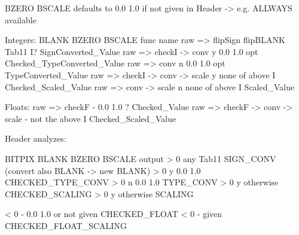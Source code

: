 

BZERO BSCALE defaults to 0.0 1.0 if not given in Header -> e.g. ALLWAYS available
				
Integers:			BLANK	BZERO BSCALE		func name
raw => flipSign		     flipBLANK	Tab11			I? SignConverted_Value
raw => checkI -> conv		  y	0.0 1.0  		opt Checked_TypeConverted_Value
raw => conv		  	  n	0.0 1.0  		opt TypeConverted_Value
raw => checkI -> conv -> scale	  y 	none of above		I Checked_Scaled_Value
raw => conv -> scale		  n	none of above		I Scaled_Value


Floats:
raw => checkF			  -	0.0 1.0			? Checked_Value
raw => checkF -> conv -> scale	  -	not the above		I Checked_Scaled_Value



Header analyzes:

BITPIX		BLANK	BZERO BSCALE		output
 > 0		 any	Tab11			SIGN_CONV (convert also BLANK -> new BLANK)
 > 0		  y	0.0 1.0			CHECKED_TYPE_CONV
 > 0		  n	0.0 1.0 		TYPE_CONV
 > 0		  y	otherwise		CHECKED_SCALING
 > 0		  y	otherwise		SCALING

 < 0		  -	0.0 1.0 or not given	CHECKED_FLOAT	
 < 0		  -	given			CHECKED_FLOAT_SCALING	

